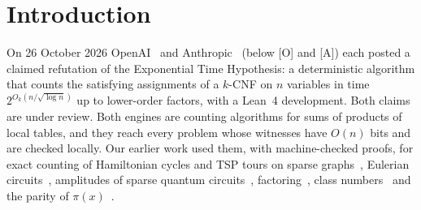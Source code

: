 \documentclass[10pt]{amsart}
\theoremstyle{plain}
\theoremstyle{definition}
\theoremstyle{remark}
\numberwithin{equation}{section}
\newcommand{\A}{\textup{[A]}}
\newcommand{\Oa}{\textup{[O]}}
\begin{document}
\maketitle

\section{Introduction}\label{sec:intro}

On 26 October 2026 OpenAI~\cite{OpenAI26} and Anthropic~\cite{Anthropic26} (below \Oa{} and \A)
each posted a claimed refutation of the Exponential Time Hypothesis: a deterministic algorithm that
counts the satisfying assignments of a $k$-CNF on $n$ variables in time $2^{O_k(n/\sqrt{\log n})}$ up
to lower-order factors, with a Lean~4 development. Both claims are under review. Both engines are
counting algorithms for sums of products of local tables, and they reach every problem whose
witnesses have $O(n)$ bits and are checked locally. Our earlier work used them, with machine-checked
proofs, for exact counting of Hamiltonian cycles and TSP tours on sparse graphs~\cite{Tul26}, Eulerian
circuits~\cite{TulEuler26}, amplitudes of sparse quantum circuits~\cite{TulQ26},
factoring~\cite{TulFac26}, class numbers~\cite{TulCN26} and the parity of $\pi(x)$~\cite{TulPar26}.
\end{document}

